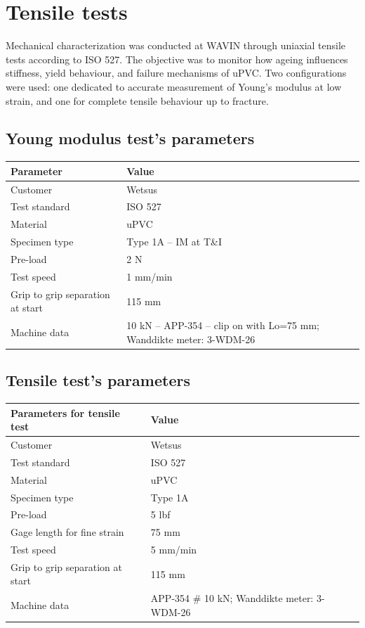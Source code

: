 \documentclass{article}
\begin{document}
\section{Tensile tests}
Mechanical characterization was conducted at WAVIN through uniaxial tensile tests according to ISO 527. The objective was to monitor how ageing influences stiffness, yield behaviour, and failure mechanisms of uPVC.
Two configurations were used: one dedicated to accurate measurement of Young’s modulus at low strain, and one for complete tensile behaviour up to fracture.

\subsection{Young modulus test's parameters}
\begin{table}[h!]
\centering
\begin{tabular}{l l}
\hline
\textbf{Parameter} & \textbf{Value} \\
\hline
Customer & Wetsus \\
Test standard & ISO 527 \\
Material & uPVC \\
Specimen type & Type 1A -- IM at T\&I \\
Pre-load & 2 N \\
Test speed & 1 mm/min \\
Grip to grip separation at start & 115 mm \\
Machine data & 10 kN -- APP-354 -- clip on with Lo=75 mm; Wanddikte meter: 3-WDM-26 \\
\hline
\end{tabular}
\end{table}
\subsection{Tensile test's parameters}
\begin{table}[h!]
\centering
\begin{tabular}{l l}
\hline
\textbf{Parameters for tensile test} & \textbf{Value} \\
\hline
Customer & Wetsus \\
Test standard & ISO 527 \\
Material & uPVC \\
Specimen type & Type 1A \\
Pre-load & 5 lbf \\
Gage length for fine strain & 75 mm \\
Test speed & 5 mm/min \\
Grip to grip separation at start & 115 mm \\
Machine data & APP-354 \# 10 kN; Wanddikte meter: 3-WDM-26 \\
\hline
\end{tabular}
\end{table}
\end{document}
